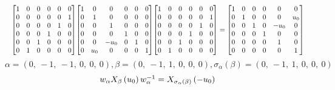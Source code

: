 \documentclass[11pt]{article}
\theoremstyle{definition}
\begin{document}
\[
\scaletoalign{\textwidth}{{\left[\begin{matrix}1 & 0 & 0 & 0 & 0 & 0\\0 & 0 & 0 & 0 & 0 & 1\\0 & 0 & 0 & 0 & 1 & 0\\0 & 0 & 0 & 1 & 0 & 0\\0 & 0 & 1 & 0 & 0 & 0\\0 & 1 & 0 & 0 & 0 & 0\end{matrix}\right]} {\left[\begin{matrix}1 & 0 & 0 & 0 & 0 & 0\\0 & 1 & 0 & 0 & 0 & 0\\0 & 0 & 1 & 0 & 0 & 0\\0 & 0 & 0 & 1 & 0 & 0\\0 & 0 & - u_{0} & 0 & 1 & 0\\0 & u_{0} & 0 & 0 & 0 & 1\end{matrix}\right]} {\left[\begin{matrix}1 & 0 & 0 & 0 & 0 & 0\\0 & 0 & 0 & 0 & 0 & 1\\0 & 0 & 0 & 0 & 1 & 0\\0 & 0 & 0 & 1 & 0 & 0\\0 & 0 & 1 & 0 & 0 & 0\\0 & 1 & 0 & 0 & 0 & 0\end{matrix}\right]} = {\left[\begin{matrix}1 & 0 & 0 & 0 & 0 & 0\\0 & 1 & 0 & 0 & 0 & u_{0}\\0 & 0 & 1 & 0 & - u_{0} & 0\\0 & 0 & 0 & 1 & 0 & 0\\0 & 0 & 0 & 0 & 1 & 0\\0 & 0 & 0 & 0 & 0 & 1\end{matrix}\right]}}
\]
\[
\alpha = \left( 0, \  -1, \  -1, \  0, \  0, \  0\right), \beta = \left( 0, \  -1, \  1, \  0, \  0, \  0\right), \sigma_{\alpha}(\beta) = \left( 0, \  -1, \  1, \  0, \  0, \  0\right)
\]
\[
\scaletoalign{\textwidth}{w_{\alpha} X_{\beta}\left(u_{0}\right) w_{\alpha}^{-1} = X_{\sigma_{\alpha}\left(\beta\right)}\left(- u_{0}\right)}
\]
\end{document}
